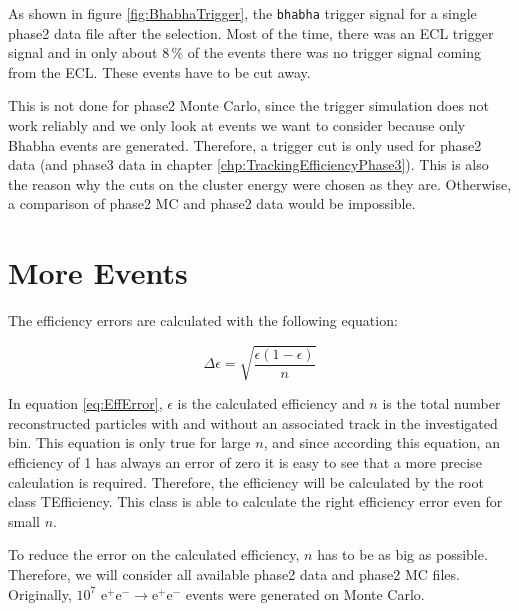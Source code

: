 \documentclass[a4paper,11pt,twosided,final,german,openbib,pdftex,listof=totoc,bibliography=totoc]{scrbook}
\begin{document}
As shown in figure \ref{fig:BhabhaTrigger}, the \texttt{bhabha} trigger signal for a single phase2 data file after the selection. Most of the time, there was an ECL trigger signal and in only about $8\,\%$ of the events there was no trigger signal coming from the ECL. These events have to be cut away.

This is not done for phase2 Monte Carlo, since the trigger simulation does not work reliably and we only look at events we want to consider because only Bhabha events are generated. Therefore, a trigger cut is only used for phase2 data (and phase3 data in chapter \ref{chp:TrackingEfficiencyPhase3}). This is also the reason why the cuts on the cluster energy were chosen as they are. Otherwise, a comparison of phase2 MC and phase2 data would be impossible.

\section{More Events}
\label{sec:Phase2MoreEvents}


The efficiency errors are calculated with the following equation:

\begin{equation}
\Delta \epsilon = \sqrt{\frac{\epsilon(1-\epsilon)}{n}}
\label{eq:EffError}
\end{equation}

In equation \ref{eq:EffError}, $\epsilon$ is the calculated efficiency and $n$ is the total number reconstructed particles with and without an associated track in the investigated bin. This equation is only true for large $n$, and since according this equation, an efficiency of 1 has always an error of zero it is easy to see that a more precise calculation is required. Therefore, the efficiency will be calculated by the root class TEfficiency. This class is able to calculate the right efficiency error even for small $n$. \cite{TEfficiency}



To reduce the error on the calculated efficiency, $n$ has to be as big as possible. Therefore, we will consider all available  phase2 data and phase2 MC files. Originally, $10^7$ $ \textrm{e}^+\textrm{e}^- \rightarrow  \textrm{e}^+\textrm{e}^-  $ events were generated on Monte Carlo.
\end{document}
